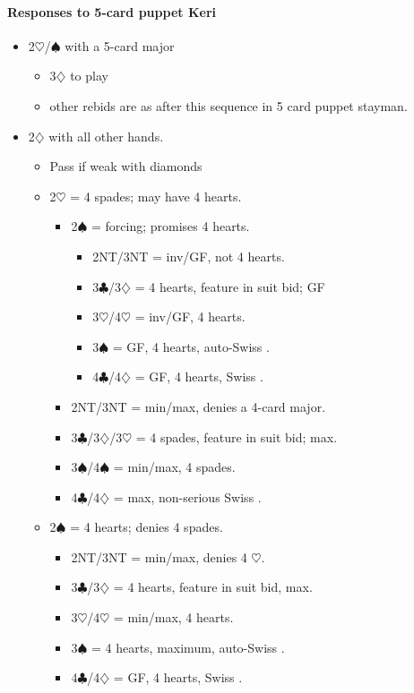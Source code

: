 \documentclass[a4paper,14pt]{extarticle}
\begin{document}
\paragraph{Responses to 5-card puppet Keri}

	\begin{itemize}
	\item 2$\heartsuit$/$\spadesuit$ with a 5-card major
		\begin{itemize}
		\item 3$\diamondsuit$ to play
		\item other rebids are as after this sequence in 5 card puppet stayman.
		\end{itemize}
	\item 2$\diamondsuit$ with all other hands. 
		\begin{itemize}
		\item Pass if weak with diamonds
		\item 2$\heartsuit$ = 4 spades; may have 4 hearts.
			\begin{itemize}
			\item 2$\spadesuit$ = forcing; promises 4 hearts.
				\begin{itemize}
				\item 2NT/3NT = inv/GF, not 4 hearts.
				\item 3$\clubsuit$/3$\diamondsuit$ = 4 hearts, feature in suit bid; GF
				\item 3$\heartsuit$/4$\heartsuit$ = inv/GF, 4 hearts.
				\item 3$\spadesuit$ = GF, 4 hearts, auto-Swiss .
				\item 4$\clubsuit$/4$\diamondsuit$ = GF, 4 hearts, Swiss .
				\end{itemize}
			\item 2NT/3NT = min/max, denies a 4-card major.
			\item 3$\clubsuit$/3$\diamondsuit$/3$\heartsuit$ = 4 spades, feature in suit bid; max.
			\item 3$\spadesuit$/4$\spadesuit$ = min/max, 4 spades.
			\item 4$\clubsuit$/4$\diamondsuit$ = max, non-serious Swiss .
			\end{itemize}

		\item 2$\spadesuit$ = 4 hearts; denies 4 spades.
			\begin{itemize}
			\item 2NT/3NT = min/max, denies 4 $\heartsuit$.
			\item 3$\clubsuit$/3$\diamondsuit$ = 4 hearts, feature in suit bid, max.
			\item 3$\heartsuit$/4$\heartsuit$ = min/max, 4 hearts.
			\item 3$\spadesuit$ = 4 hearts, maximum, auto-Swiss .
			\item 4$\clubsuit$/4$\diamondsuit$ = GF, 4 hearts, Swiss .
			\end{itemize}


\end{itemize}
\end{itemize}
\end{document}
